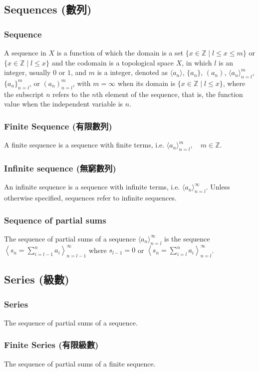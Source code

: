 \documentclass[a4paper,12pt]{report}
\begin{document}
\subsection{Sequences (數列)}
\subsubsection{Sequence}
A sequence in $X$ is a function of which the domain is a set $\{x\in\mathbb{Z}\mid l\leq x\leq m\}$ or $\{x\in\mathbb{Z}\mid l\leq x\}$ and the codomain is a topological space $X$, in which $l$ is an integer, usually $0$ or $1$, and $m$ is a integer, denoted as $\langle a_n\rangle$, $\{a_n\}$, $(a_n)$, $\langle a_n\rangle_{n=l}^m$, $\{a_n\}_{n=l}^m$, or $(a_n)_{n=l}^m$, with $m=\infty$ when its domain is $\{x\in\mathbb{Z}\mid l\leq x\}$, where the subscript $n$ refers to the $n$th element of the sequence, that is, the function value when the  independent variable is $n$.
\subsubsection{Finite Sequence (有限數列)}
A finite sequence is a sequence with finite terms, i.e. $\langle a_n\rangle_{n=l}^m,\quad m\in\mathbb{Z}$.
\subsubsection{Infinite sequence (無窮數列)}
An infinite sequence is a sequence with infinite terms, i.e. $\langle a_n\rangle_{n=l}^\infty$. Unless otherwise specified, sequences refer to infinite sequences.
\subsubsection{Sequence of partial sums}
The sequence of partial sums of a sequence $\langle a_n\rangle_{n=l}^{\infty}$ is the sequence $\left\langle s_n=\sum_{i=l-1}^na_i\right\rangle_{n=l-1}^{\infty}$ where $s_{l-1}=0$ or $\left\langle s_n=\sum_{i=l}^na_i\right\rangle_{n=l}^{\infty}$.
\subsection{Series (級數)}
\subsubsection{Series}
The sequence of partial sums of a sequence.
\subsubsection{Finite Series (有限級數)}
The sequence of partial sums of a finite sequence.
\end{document}

